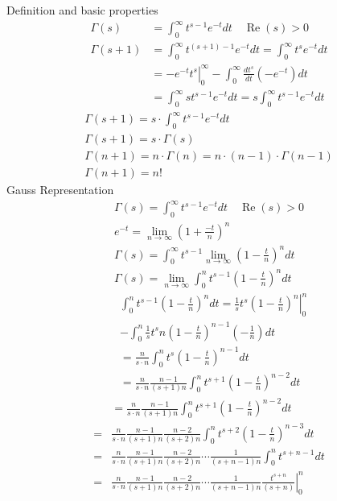 

	Definition and basic properties
	$$
	\begin{aligned}
		\Gamma(s) &=\int_0^{\infty} t^{s-1} e^{-t} d t \quad \operatorname{Re}(s)>0 \\
		\Gamma(s+1) &=\int_0^{\infty} t^{(s+1)-1} e^{-t} d t=\int_0^{\infty} t^s e^{-t} d t \\
		&=-\left.e^{-t} t^s\right|_0 ^{\infty}-\int_0^{\infty} \frac{d t^s}{d t}\left(-e^{-t}\right) d t \\
		&=\int_0^{\infty} s t^{s-1} e^{-t} d t=s \int_0^{\infty} t^{s-1} e^{-t} d t
	\end{aligned}
	$$
	$$
	\begin{gathered}
		\Gamma(s+1)=s \cdot \int_0^{\infty} t^{s-1} e^{-t} d t \\
		\Gamma(s+1)=s \cdot \Gamma(s) \\
		\Gamma(n+1)=n \cdot \Gamma(n)=n \cdot(n-1) \cdot \Gamma(n-1) \\
		\Gamma(n+1)=n !
	\end{gathered}
	$$
	Gauss Representation
	$$
	\begin{gathered}
		\Gamma(s)=\int_0^{\infty} t^{s-1} e^{-t} d t \quad \operatorname{Re}(s)>0 \\
		e^{-t}=\lim _{n \rightarrow \infty}\left(1+\frac{-t}{n}\right)^n \\
		\Gamma(s)=\int_0^{\infty} t^{s-1} \lim _{n \rightarrow \infty}\left(1-\frac{t}{n}\right)^n d t \\
		\Gamma(s)=\lim _{n \rightarrow \infty} \int_0^{n} t^{s-1}\left(1-\frac{t}{n}\right)^n d t
	\end{gathered}
	$$
	$$
	\begin{aligned}
		&\int_0^n t^{s-1}\left(1-\frac{t}{n}\right)^n d t=\left.\frac{1}{s} t^s\left(1-\frac{t}{n}\right)^n\right|_0 ^n \\
		&-\int_0^n \frac{1}{s} t^s n\left(1-\frac{t}{n}\right)^{n-1}\left(-\frac{1}{n}\right) d t \\
		&=\frac{n}{s \cdot n} \int_0^n t^s\left(1-\frac{t}{n}\right)^{n-1} d t \\
		&=\frac{n}{s \cdot n} \frac{n-1}{(s+1) n} \int_0^n t^{s+1}\left(1-\frac{t}{n}\right)^{n-2} d t
	\end{aligned}
	$$
	$$
	\begin{aligned}
		&=\frac{n}{s \cdot n} \frac{n-1}{(s+1) n} \int_0^n t^{s+1}\left(1-\frac{t}{n}\right)^{n-2} d t \\
		=& \frac{n}{s \cdot n} \frac{n-1}{(s+1) n} \frac{n-2}{(s+2) n} \int_0^n t^{s+2}\left(1-\frac{t}{n}\right)^{n-3} d t \\
		=& \frac{n}{s \cdot n} \frac{n-1}{(s+1) n} \frac{n-2}{(s+2) n} \cdots \frac{1}{(s+n-1) n} \int_0^n t^{s+n-1} d t \\
		=&\left.\frac{n}{s \cdot n} \frac{n-1}{(s+1) n} \frac{n-2}{(s+2) n} \cdots \frac{1}{(s+n-1) n} \frac{t^{s+n}}{(s+n)}\right|_0 ^n
	\end{aligned}
	$$
